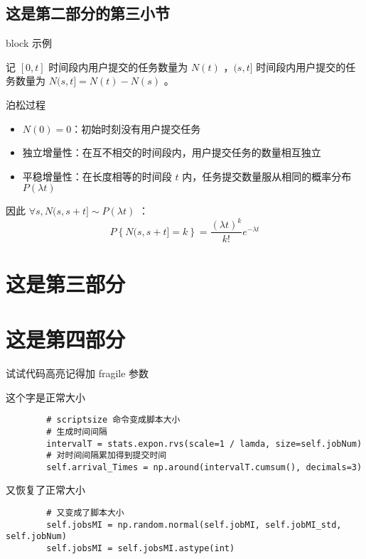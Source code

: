 \documentclass[aspectratio=169]{beamer}
\begin{document}
\subsection{这是第二部分的第三小节}

\begin{frame}{block 示例}

    记 $[0,t]$ 时间段内用户提交的任务数量为 $N(t)$ ，$(s,t]$ 时间段内用户提交的任务数量为 $N(s,t] = N(t) - N(s)$ 。

    \begin{block}{泊松过程}
        \begin{itemize}
            \item $N(0)=0$：初始时刻没有用户提交任务
            \item 独立增量性：在互不相交的时间段内，用户提交任务的数量相互独立
            \item 平稳增量性：在长度相等的时间段 $t$ 内，任务提交数量服从相同的概率分布 $P(\lambda t)$
        \end{itemize}
    \end{block}

    因此 $\forall s, N(s,s+t] \sim P(\lambda t)$ ：
    $$P\left\{N(s,s+t]=k\right\} = \frac{(\lambda t)^k}{k!} e^{-\lambda t}$$

\end{frame}

\section{这是第三部分}



\section{这是第四部分}

\begin{frame}[fragile]{试试代码高亮}{记得加 fragile 参数}

    这个字是正常大小

    \scriptsize
    \begin{verbatim}
        # scriptsize 命令变成脚本大小
        # 生成时间间隔
        intervalT = stats.expon.rvs(scale=1 / lamda, size=self.jobNum)
        # 对时间间隔累加得到提交时间
        self.arrival_Times = np.around(intervalT.cumsum(), decimals=3)
    \end{verbatim}

    \normalsize
    又恢复了正常大小

    \scriptsize
    \begin{verbatim}
        # 又变成了脚本大小
        self.jobsMI = np.random.normal(self.jobMI, self.jobMI_std, self.jobNum)
        self.jobsMI = self.jobsMI.astype(int)
    \end{verbatim}

\end{frame}
\end{document}
